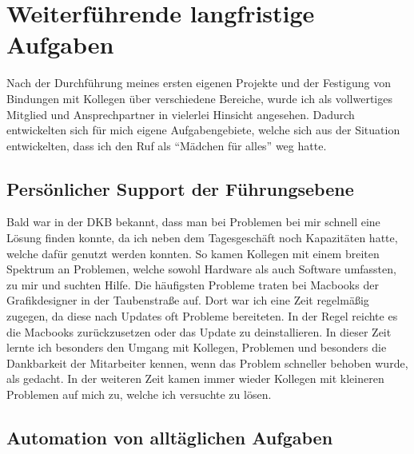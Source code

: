 \section{Weiterführende langfristige Aufgaben }
\label{sec:Weiterführende langfristige Aufgaben}

Nach der Durchführung meines ersten eigenen Projekte und der Festigung von Bindungen mit Kollegen über verschiedene Bereiche, wurde ich als vollwertiges Mitglied und Ansprechpartner in vielerlei Hinsicht angesehen. Dadurch entwickelten sich für mich eigene Aufgabengebiete, welche sich aus der Situation entwickelten, dass ich den Ruf als “Mädchen für alles” weg hatte. 

\subsection{Persönlicher Support der Führungsebene}
\label{sec:Persönlicher Support der Führungsebene}

Bald war in der DKB bekannt, dass man bei Problemen bei mir schnell eine Lösung finden konnte, da ich neben dem Tagesgeschäft noch Kapazitäten hatte, welche dafür genutzt werden konnten. So kamen Kollegen mit einem breiten Spektrum an Problemen, welche sowohl Hardware als auch Software umfassten, zu mir und suchten Hilfe. Die häufigsten Probleme traten bei Macbooks der Grafikdesigner in der Taubenstraße auf. Dort war ich eine Zeit regelmäßig zugegen, da diese nach Updates oft Probleme bereiteten. In der Regel reichte es die Macbooks zurückzusetzen oder das Update zu deinstallieren. In dieser Zeit lernte ich besonders den Umgang mit Kollegen, Problemen und besonders die Dankbarkeit der Mitarbeiter kennen, wenn das Problem schneller behoben wurde, als gedacht. In der weiteren Zeit kamen immer wieder Kollegen mit kleineren Problemen auf mich zu, welche ich versuchte zu lösen.

\subsection{Automation von alltäglichen Aufgaben}
\label{sec:Automation von alltäglichen Aufgaben}


